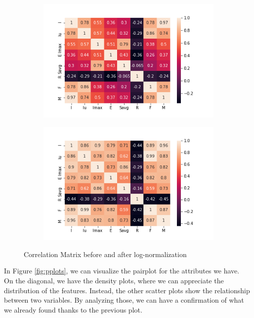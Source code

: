 \begin{figure}
\begin{subfigure}{.49\textwidth}
\centering
\includegraphics[width=.95\textwidth]{img/preparation/features_corr.png}
\caption{}
\label{fig:features_corr}
\end{subfigure}
\begin{subfigure}{.49\textwidth}
\centering
\captionsetup{justification=centering}
\includegraphics[width=.95\textwidth]{img/preparation/features_corr_logs.png}
\caption{}
\label{fig:features_corr_logs}
\end{subfigure}
\caption{Correlation Matrix before and after log-normalization}
\end{figure}

In Figure \ref{fig:pplots}, we can visualize the pairplot for the attributes we have.\\
On the diagonal, we have the density plots, where we can appreciate the distribution of the features. Instead, the other scatter plots show the relationship between two variables. By analyzing those, we can have a confirmation of what we already found thanks to the previous plot. 

